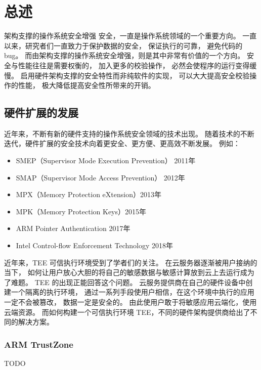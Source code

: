\chapter{总述} %

\label{Chapter1} %

架构支撑的操作系统安全增强
安全，一直是操作系统领域的一个重要方向。
一直以来，研究者们一直致力于保护数据的安全，
保证执行的可靠，
避免代码的 bug。
而由架构支撑的操作系统安全增强，则是其中非常有价值的一个方向。
安全与性能往往是需要权衡的，
加入更多的校验操作，
必然会使程序的运行变得缓慢。
启用硬件架构支撑的安全特性而非纯软件的实现，
可以大大提高安全校验操作的性能，
极大降低提高安全性所带来的开销。

\section{硬件扩展的发展}
近年来，不断有新的硬件支持的操作系统安全领域的技术出现。
随着技术的不断迭代，硬件扩展的安全技术向着更安全、更方便、更高效不断发展。
例如：
\begin{itemize}
    \item SMEP（Supervisor Mode Execution Prevention） 2011年
    \item SMAP（Supervisor Mode Access Prevention） 2012年
    \item MPX（Memory Protection eXtension）2013年
    \item MPK（Memory Protection Keys）2015年
    \item ARM Pointer Authentication 2017年
    \item Intel Control-flow Enforcement Technology 2018年
\end{itemize}
近年来，TEE 可信执行环境受到了学者们的关注。
在云服务器逐渐被用户接纳的当下，
如何让用户放心大胆的将自己的敏感数据与敏感计算放到云上去运行成为了难题。
TEE 的出现正能回答这个问题。
云服务提供商在自己的硬件设备中创建一个隔离的执行环境，
通过一系列手段使用户相信，在这个环境中执行的应用一定不会被篡改，
数据一定是安全的。
由此使用户敢于将敏感应用云端化，使用云端资源。
而如何构建一个可信执行环境 TEE，不同的硬件架构提供商给出了不同的解决方案。

\subsection{ARM TrustZone}
TODO
